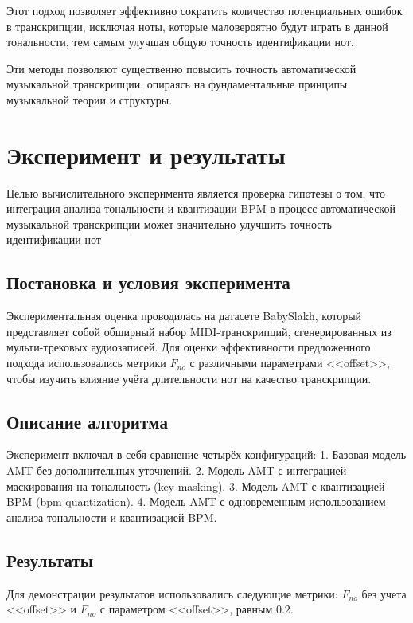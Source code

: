 \documentclass[a4paper, 12pt]{article} %
\begin{document}
Этот подход позволяет эффективно сократить количество потенциальных ошибок в транскрипции, исключая ноты, которые маловероятно будут играть в данной тональности, тем самым улучшая общую точность идентификации нот.

Эти методы позволяют существенно повысить точность автоматической музыкальной транскрипции, опираясь на фундаментальные принципы музыкальной теории и структуры.


\section{Эксперимент и результаты}

Целью вычислительного эксперимента является проверка гипотезы о том, что интеграция анализа тональности и квантизации BPM в процесс автоматической музыкальной транскрипции может значительно улучшить точность идентификации нот%

\subsection{Постановка и условия эксперимента}

Экспериментальная оценка проводилась на датасете BabySlakh, который представляет собой обширный набор MIDI-транскрипций, сгенерированных из мульти-трековых аудиозаписей. Для оценки эффективности предложенного подхода использовались метрики $F_{no}$ с различными параметрами <<offset>>, чтобы изучить влияние учёта длительности нот на качество транскрипции.

\subsection{Описание алгоритма}

Эксперимент включал в себя сравнение четырёх конфигураций:
1. Базовая модель AMT без дополнительных уточнений.
2. Модель AMT с интеграцией маскирования на тональность (key masking).
3. Модель AMT с квантизацией BPM (bpm quantization).
4. Модель AMT с одновременным использованием анализа тональности и квантизацией BPM.

\subsection{Результаты}

Для демонстрации результатов использовались следующие метрики: $F_{no}$ без учета <<offset>> и $F_{no}$ с параметром <<offset>>, равным $0.2$.
\end{document}
